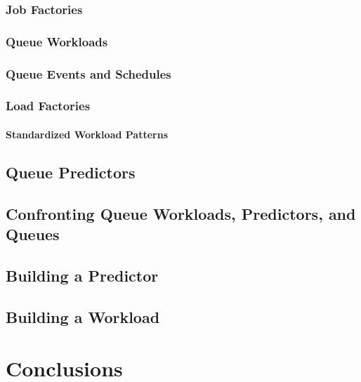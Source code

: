 \documentclass[12pt]{book}
\begin{document}
\subsection{Job Factories}

\subsection{Queue Workloads}

\subsection{Queue Events and Schedules}

\subsection{Load Factories}

\subsubsection{Standardized Workload Patterns}

\section{Queue Predictors}

\section{Confronting Queue Workloads, Predictors, and Queues}

\section{Building a Predictor}

\section{Building a Workload}

\chapter{Conclusions}
\end{document}
